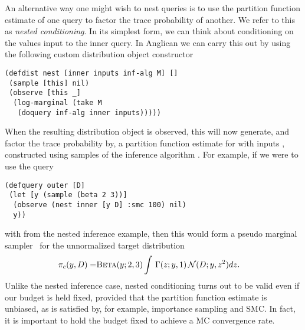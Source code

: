 An alternative way one might wish to nest queries is to 
use the partition function estimate of one query to factor the trace probability of another.
We refer to this as \emph{nested conditioning}.  
In its simplest form, we can think about conditioning on the values input
to the inner query.  In Anglican we can carry this out by
using the following custom distribution object constructor
\begin{lstlisting}[basicstyle=\ttfamily\footnotesize,frame=none]
(defdist nest [inner inputs inf-alg M] []
 (sample [this] nil)
 (observe [this _] 
  (log-marginal (take M 
   (doquery inf-alg inner inputs)))))    
\end{lstlisting}
\vspace{-4pt}
When the resulting distribution object is observed, this will now generate, and factor the
trace probability by,
a partition function estimate for  with inputs , constructed using  
samples of the inference algorithm .  For example, if we were to use the query 
\begin{lstlisting}[basicstyle=\ttfamily\footnotesize,frame=none]
(defquery outer [D]
 (let [y (sample (beta 2 3))]
  (observe (nest inner [y D] :smc 100) nil) 
  y))
\end{lstlisting}
\vspace{-4pt}
with  from the nested inference example, then this would form a
pseudo marginal sampler~\citep{andrieu2009pseudo} for the unnormalized target distribution
\begin{align*}
	\pi_c(y,D)=&\textsc{Beta}(y;2,3) \int  \, \Gamma(z;y,1) \, \mathcal{N}(D;y,z^2) dz.
\end{align*}
Unlike the nested inference case, nested conditioning turns out to be valid even if our
budget is held fixed, provided that the partition function estimate is unbiased,
as is satisfied by, for example, importance sampling and SMC.  In fact, it is important to hold the budget fixed to achieve 
a MC convergence rate.


